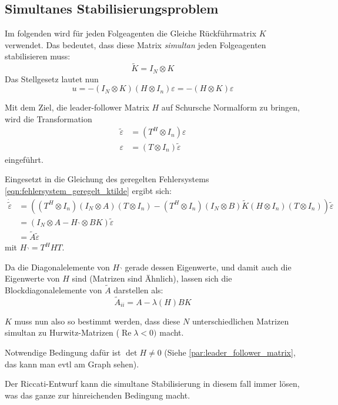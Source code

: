 \subsection{Simultanes Stabilisierungsproblem}
Im folgenden wird für jeden Folgeagenten die Gleiche Rückführmatrix $K$ verwendet.
Das bedeutet, dass diese Matrix \emph{simultan} jeden Folgeagenten stabilisieren
muss:
\begin{equation}
    \tilde{K}=I_N \otimes K
\end{equation}
Das Stellgesetz lautet nun
\begin{equation}
    u=-(I_N \otimes K) (H \otimes I_n)\varepsilon = -(H \otimes K)\varepsilon
\end{equation}

Mit dem Ziel, die leader-follower Matrix $H$ auf Schursche Normalform zu bringen,
wird die Transformation
\begin{align}
    \tilde{\varepsilon} &= (T^H \otimes I_n)\varepsilon \\
    \varepsilon &= (T \otimes I_n)\tilde{\varepsilon}
\end{align}
eingeführt.

Eingesetzt in die Gleichung des geregelten Fehlersystems \ref{eqn:fehlersystem_geregelt_ktilde}
ergibt sich:
\begin{align}
    \dot{\tilde{\varepsilon}} &=((T^H \otimes I_n)(I_N \otimes A)(T \otimes I_n) - (T^H \otimes I_n)(I_N \otimes B)\tilde{K}(H \otimes I_n)(T \otimes I_n)) \tilde{\varepsilon} \\
    &= (I_N \otimes A - H_\urcorner \otimes BK)\tilde{\varepsilon} \\
    &= \tilde{A}\tilde{\varepsilon} 
\end{align}
mit $H_\urcorner = T^H H T$.

Da die Diagonalelemente von $H_\urcorner$ gerade dessen Eigenwerte, und damit auch die
Eigenwerte von $H$ sind (Matrizen sind Ähnlich), lassen sich die Blockdiagonalelemente von
$\tilde{A}$ darstellen als:
\begin{equation}
    \tilde{A}_{ii} = A-\lambda(H)BK
\end{equation}

$K$ muss nun also so bestimmt werden, dass diese $N$ unterschiedlichen Matrizen simultan
zu Hurwitz-Matrizen ($\operatorname{Re}\lambda < 0)$ macht.

Notwendige Bedingung dafür ist $\det H \neq 0$ (Siehe \ref{par:leader_follower_matrix},
das kann man evtl am Graph sehen).

Der Riccati-Entwurf kann die simultane Stabilisierung in diesem fall immer lösen,
was das ganze zur hinreichenden Bedingung macht.

